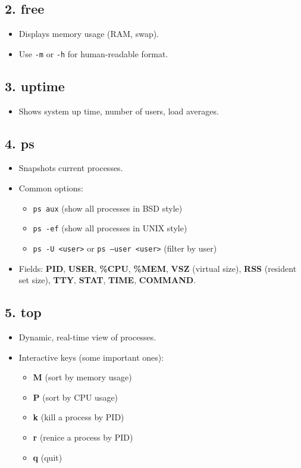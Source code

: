 \documentclass[a4paper]{report}
\begin{document}
\subsection*{2. free}
\begin{itemize}
    \item Displays memory usage (RAM, swap).
    \item Use \texttt{-m} or \texttt{-h} for human-readable format.
\end{itemize}

\subsection*{3. uptime}
\begin{itemize}
    \item Shows system up time, number of users, load averages.
\end{itemize}

\subsection*{4. ps}
\begin{itemize}
    \item Snapshots current processes.
    \item Common options:
    \begin{itemize}
        \item \texttt{ps aux} (show all processes in BSD style)
        \item \texttt{ps -ef} (show all processes in UNIX style)
        \item \texttt{ps -U <user>} or \texttt{ps --user <user>} (filter by user)
    \end{itemize}
    \item Fields: \textbf{PID}, \textbf{USER}, \textbf{\%CPU}, \textbf{\%MEM}, \textbf{VSZ} (virtual size), \textbf{RSS} (resident set size), \textbf{TTY}, \textbf{STAT}, \textbf{TIME}, \textbf{COMMAND}.
\end{itemize}

\subsection*{5. top}
\begin{itemize}
    \item Dynamic, real-time view of processes.
    \item Interactive keys (some important ones):
    \begin{itemize}
        \item \textbf{M} (sort by memory usage)
        \item \textbf{P} (sort by CPU usage)
        \item \textbf{k} (kill a process by PID)
        \item \textbf{r} (renice a process by PID)
        \item \textbf{q} (quit)
    \end{itemize}
\end{itemize}
\end{document}
